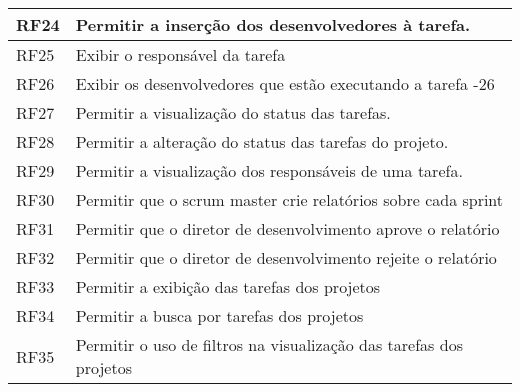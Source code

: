 \begin{table}[H]
\begin{tabular}{|l|l|}
            RF24 & Permitir a inserção dos desenvolvedores à tarefa.                                                                                                     \\ \hline
            RF25 & Exibir o responsável da tarefa                                                                                                                        \\ \hline
            RF26 & Exibir os desenvolvedores que estão executando a tarefa -26                                                                                           \\ \hline
            RF27 & Permitir a visualização do status das tarefas.                                                                                                        \\ \hline
            RF28 & Permitir a alteração do status das tarefas do projeto.                                                                                                \\ \hline
            RF29 & Permitir a visualização dos responsáveis de uma tarefa.                                                                                               \\ \hline
            RF30 & Permitir que o scrum master crie relatórios sobre cada sprint                                                                                         \\ \hline
            RF31 & Permitir que o diretor de desenvolvimento aprove o relatório                                                                                          \\ \hline
            RF32 & Permitir que o diretor de desenvolvimento rejeite o relatório                                                                                         \\ \hline
            RF33 & Permitir a exibição das tarefas dos projetos                                                                                                          \\ \hline
            RF34 & Permitir a busca por tarefas dos projetos                                                                                                             \\ \hline
            RF35 & Permitir o uso de filtros na visualização das tarefas dos projetos                                                                                    \\ \hline
        \end{tabular}
    \end{table}
        
        
        
